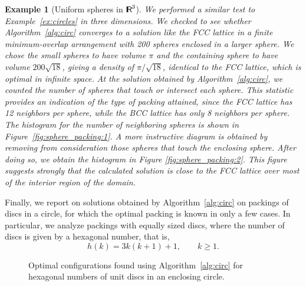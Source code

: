 \documentclass{siamltex}
\newtheorem{Exa}{Example}[section]
\begin{document}
\begin{Exa}[Uniform spheres in ${\makebox{\sf I \hspace{-8.5 pt} R \hspace{-4.0pt}}}^3$] \label{ex:spheres}
We performed a similar test to Example~\ref{ex:circles} in three
dimensions. 
We checked to see whether Algorithm~\ref{alg:circ} converges to a
solution like the FCC lattice
in a finite minimum-overlap arrangement with 200 spheres enclosed in a
larger sphere. We chose the small spheres to have volume $\pi$ and the
containing sphere to have volume $200\sqrt{18}$, giving a density of
$\pi/\sqrt{18}$, identical to the FCC lattice, which is optimal in
infinite space. At the solution obtained by Algorithm~\ref{alg:circ},
we counted the number of spheres that touch or intersect each
sphere. This statistic provides an indication of the type of packing
attained, since the FCC lattice has 12 neighbors per sphere, while the
BCC lattice has only 8 neighbors per sphere. The histogram for the
number of neighboring spheres is shown in
Figure~\ref{fig:sphere_packing:1}. A more instructive diagram is
obtained by removing from consideration those spheres that touch the
enclosing sphere. After doing so, we obtain the histogram in Figure
\ref{fig:sphere_packing:2}. This figure suggests strongly that the
calculated solution is close to the FCC lattice over most of the
interior region of the domain.
\end{Exa}

Finally, we report on solutions obtained by Algorithm~\ref{alg:circ}
on packings of discs in a circle, for which the optimal packing is
known in only a few cases. In particular, we analyze packings with
equally sized discs, where the number of discs is given by a hexagonal
number, that is, 
\begin{equation} \label{eq:hex}
h(k)=3k(k+1)+1, \qquad k \geq 1.
\end{equation}

\begin{figure}
\centering
{} \;
 \;
\;
\caption{Optimal configurations found using
    Algorithm~\ref{alg:circ} for hexagonal numbers of unit discs in an enclosing circle.}
\label{fig:curved}
\end{figure}
\end{document}
